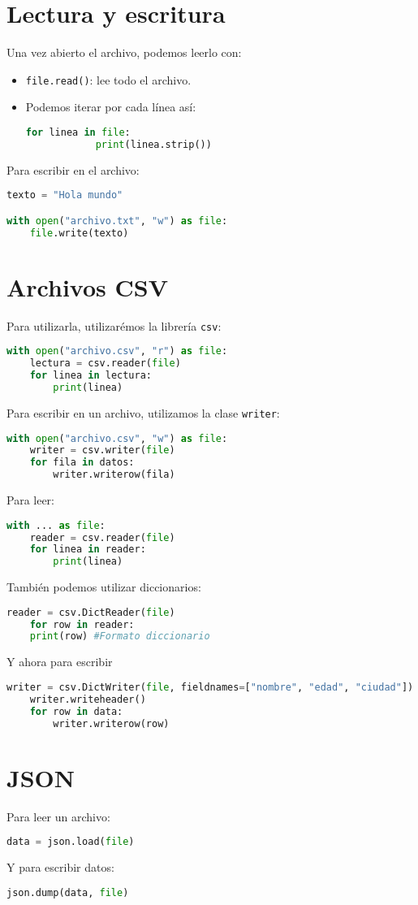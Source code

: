 \documentclass{./Programacion.tex}
\begin{document}
\section{Lectura y escritura}
Una vez abierto el archivo, podemos leerlo con:
\begin{itemize}
	\item \verb|file.read()|: lee todo el archivo.
	\item Podemos iterar por cada línea así:
		\begin{lstlisting}[language=python]
		for linea in file:
			print(linea.strip())
		\end{lstlisting}
\end{itemize}
Para escribir en el archivo:
\begin{lstlisting}[language=python]
texto = "Hola mundo"

with open("archivo.txt", "w") as file:
	file.write(texto)
\end{lstlisting}
\section{Archivos CSV}	
Para utilizarla, utilizarémos la librería \verb|csv|:
\begin{lstlisting}[language=python]
with open("archivo.csv", "r") as file:
	lectura = csv.reader(file)
	for linea in lectura:
		print(linea)
\end{lstlisting}
Para escribir en un archivo, utilizamos la clase \verb|writer|:
\begin{lstlisting}[language=python]
with open("archivo.csv", "w") as file:
	writer = csv.writer(file)
	for fila in datos:
		writer.writerow(fila)
\end{lstlisting}
Para leer:
\begin{lstlisting}[language=python]
with ... as file:
	reader = csv.reader(file)
	for linea in reader:
		print(linea)
\end{lstlisting}
También podemos utilizar diccionarios:
\begin{lstlisting}[language=python]
	reader = csv.DictReader(file)
	for row in reader:
	print(row) #Formato diccionario
\end{lstlisting}
Y ahora para escribir
\begin{lstlisting}[language=python]
	writer = csv.DictWriter(file, fieldnames=["nombre", "edad", "ciudad"])
	writer.writeheader()
	for row in data:
		writer.writerow(row)
\end{lstlisting}
\section{JSON}
Para leer un archivo:
\begin{lstlisting}[language=python]
	data = json.load(file)
\end{lstlisting}
Y para escribir datos:
\begin{lstlisting}[language=python]
	json.dump(data, file)
\end{lstlisting}
\end{document}
